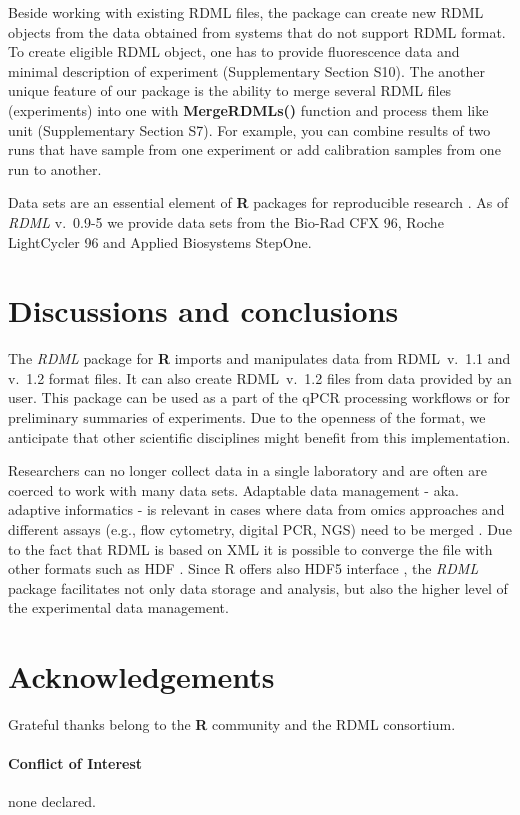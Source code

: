 \documentclass{bioinfo}
\begin{document}
	Beside working with existing RDML files, the package can create new RDML 
objects from the data obtained from systems that do not support RDML format. To 
create eligible RDML object, one has to provide fluorescence data and minimal 
description of experiment (Supplementary Section S10). The another unique feature of our 
package is the ability to merge several RDML files (experiments) into one with 
\textbf{MergeRDMLs()} function and process them like unit (Supplementary Section 
S7). For example, you can combine results of two runs that have sample from one 
experiment or add calibration samples from one run to another.

Data sets are an essential element of \textbf{R} packages for reproducible 
research \cite{roediger2015r}. As of \textit{RDML} v.~0.9-5 we provide data sets 
from the Bio-Rad CFX 96, Roche LightCycler 96 and Applied Biosystems StepOne.

\section{Discussions and conclusions}
	
	The \textit{RDML} package for \textbf{R} imports and manipulates data 
from RDML~v.~1.1 and v.~1.2 format files. It can also create RDML~v.~1.2 files 
from data provided by an user. This package can be used as a part of the qPCR 
processing workflows or for preliminary summaries of experiments. Due to the 
openness of the format, we anticipate that other scientific disciplines might 
benefit from this implementation.

Researchers can no longer collect data in a single laboratory and are often are 
coerced to work with many data sets. Adaptable data management - aka. adaptive 
informatics - is relevant in cases where data from omics approaches and 
different assays (e.g., flow cytometry, digital PCR, NGS) need to be merged 
\cite{baker_quantitative_2012}. Due to the fact that RDML is based on XML it is 
possible to converge the file with other formats such as HDF 
\cite{millard_adaptive_2011}. Since R offers also HDF5 interface 
\cite{Fischer_HDF5}, the \textit{RDML} package facilitates not only data storage 
and analysis, but also the higher level of the experimental data management.

\section{Acknowledgements}
Grateful thanks belong to the \textbf{R} community and the RDML consortium.
	
\paragraph{Conflict of Interest\textcolon} none declared.

%
%
%
%
%
%

%

\end{document}
